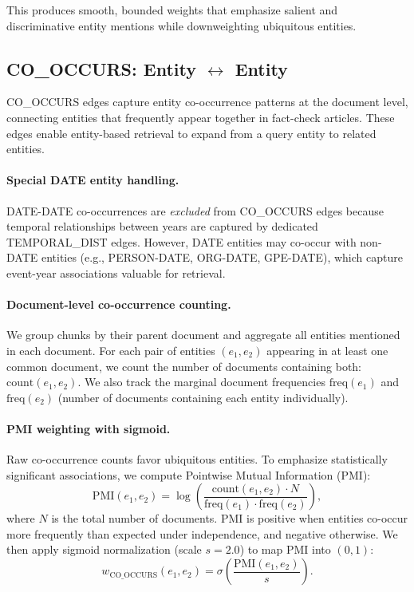 \documentclass[10pt]{article}
\begin{document}
This produces smooth, bounded weights that emphasize salient and discriminative entity mentions while downweighting ubiquitous entities.

\subsection{CO\_OCCURS: Entity $\leftrightarrow$ Entity}

CO\_OCCURS edges capture entity co-occurrence patterns at the document level, connecting entities that frequently appear together in fact-check articles. These edges enable entity-based retrieval to expand from a query entity to related entities.

\paragraph{Special DATE entity handling.} DATE-DATE co-occurrences are \emph{excluded} from CO\_OCCURS edges because temporal relationships between years are captured by dedicated TEMPORAL\_DIST edges. However, DATE entities may co-occur with non-DATE entities (e.g., PERSON-DATE, ORG-DATE, GPE-DATE), which capture event-year associations valuable for retrieval.

\paragraph{Document-level co-occurrence counting.} We group chunks by their parent document and aggregate all entities mentioned in each document. For each pair of entities $(e_1, e_2)$ appearing in at least one common document, we count the number of documents containing both: $\text{count}(e_1, e_2)$. We also track the marginal document frequencies $\text{freq}(e_1)$ and $\text{freq}(e_2)$ (number of documents containing each entity individually).

\paragraph{PMI weighting with sigmoid.} Raw co-occurrence counts favor ubiquitous entities. To emphasize statistically significant associations, we compute Pointwise Mutual Information (PMI):
\[
\text{PMI}(e_1, e_2) = \log\left(\frac{\text{count}(e_1, e_2) \cdot N}{\text{freq}(e_1) \cdot \text{freq}(e_2)}\right),
\]
where $N$ is the total number of documents. PMI is positive when entities co-occur more frequently than expected under independence, and negative otherwise. We then apply sigmoid normalization (scale $s=2.0$) to map PMI into $(0,1)$:
\[
w_{\text{CO\_OCCURS}}(e_1, e_2) = \sigma\left(\frac{\text{PMI}(e_1, e_2)}{s}\right).
\]
\end{document}
